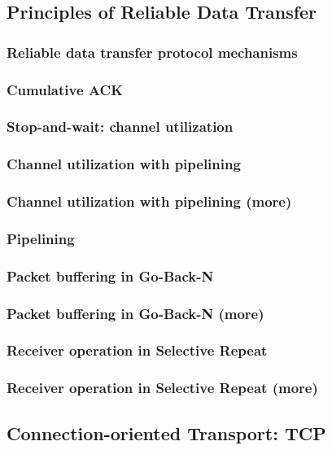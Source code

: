 \subsection*{Principles of Reliable Data Transfer}
    \subsubsection*{Reliable data transfer protocol mechanisms}
    \subsubsection*{Cumulative ACK}
    \subsubsection*{Stop-and-wait: channel utilization}
    \subsubsection*{Channel utilization with pipelining}
    \subsubsection*{Channel utilization with pipelining (more)}
    \subsubsection*{Pipelining}
    \subsubsection*{Packet buffering in Go-Back-N}
    \subsubsection*{Packet buffering in Go-Back-N (more)}
    \subsubsection*{Receiver operation in Selective Repeat}
    \subsubsection*{Receiver operation in Selective Repeat (more)}


\subsection*{Connection-oriented Transport: TCP}

